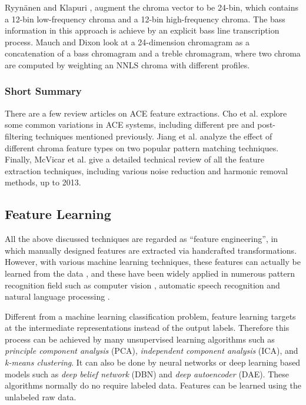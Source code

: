 Ryynänen and Klapuri \cite{ryynanen2008automatic}, augment the chroma vector to be 24-bin, which contains a 12-bin low-frequency chroma and a 12-bin high-frequency chroma. The bass information in this approach is achieve by an explicit bass line transcription process. Mauch and Dixon \cite{mauch2010approximate,mauch2010simultaneous} look at a 24-dimension chromagram as a concatenation of a bass chromagram and a treble chromagram, where two chroma are computed by weighting an NNLS chroma with different profiles.

\subsubsection{Short Summary}
There are a few review articles on ACE feature extractions. Cho et al. \cite{cho2010exploring} explore some common variations in ACE systems, including different pre and post-filtering techniques mentioned previously. Jiang et al. \cite{jiang2011analyzing} analyze the effect of different chroma feature types on two popular pattern matching techniques. Finally, McVicar et al. \cite{mcvicar2014automatic} give a detailed technical review of all the feature extraction techniques, including various noise reduction and harmonic removal methods, up to 2013.


\subsection{Feature Learning} \label{sec:2-fl}
All the above discussed techniques are regarded as ``feature engineering'', in which manually designed features are extracted via handcrafted transformations. However, with various machine learning techniques, these features can actually be learned from the data \cite{bengio2009learning}, and these have been widely applied in numerous pattern recognition field such as computer vision \cite{hinton2006reducing}, automatic speech recognition and natural language processing \cite{deng2014deep}.

Different from a machine learning classification problem, feature learning targets at the intermediate representations instead of the output labels. Therefore this process can be achieved by many unsupervised learning algorithms such as {\it principle component analysis} (PCA), {\it independent component analysis} (ICA), and {\it k-means clustering}. It can also be done by neural networks or deep learning based models such as {\it deep belief network} (DBN) and {\it deep autoencoder} (DAE). These algorithms normally do no require labeled data. Features can be learned using the unlabeled raw data.

